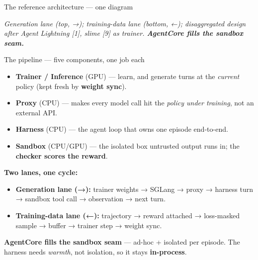 \documentclass[
  10pt,
  ignorenonframetext,
  aspectratio=169,
  t]{beamer}
\providecommand{\tightlist}{%
  \setlength{\itemsep}{0pt}\setlength{\parskip}{0pt}}
\begin{document}
\begin{frame}[allowframebreaks]{The reference architecture --- one diagram}
\begin{center}
{%
}
\end{center}

\emph{Generation lane (top, →); training-data lane (bottom, ←);
disaggregated design after Agent Lightning {[}1{]}, slime {[}9{]} as
trainer. \textbf{AgentCore fills the sandbox seam.}}
\end{frame}

\begin{frame}[allowframebreaks]{The pipeline --- five components, one job each}
\protect\hypertarget{the-pipeline-five-components-one-job-each}{}
\begin{itemize}
\tightlist
\item
  \textbf{Trainer / Inference} (GPU) --- learn, and generate turns at
  the \emph{current} policy (kept fresh by \textbf{weight sync}).
\item
  \textbf{Proxy} (CPU) --- makes every model call hit the \emph{policy
  under training}, not an external API.
\item
  \textbf{Harness} (CPU) --- the agent loop that owns one episode
  end-to-end.
\item
  \textbf{Sandbox} (CPU/GPU) --- the isolated box untrusted output runs
  in; the \textbf{checker scores the reward}.
\end{itemize}

\textbf{Two lanes, one cycle:}

\begin{itemize}
\tightlist
\item
  \textbf{Generation lane (→):} trainer weights → SGLang → proxy →
  harness turn → sandbox tool call → observation → next turn.
\item
  \textbf{Training-data lane (←):} trajectory → reward attached →
  loss-masked sample → buffer → trainer step → weight sync.
\end{itemize}

\textbf{AgentCore fills the sandbox seam} --- ad-hoc + isolated per
episode. The harness needs \emph{warmth}, not isolation, so it stays
\textbf{in-process}.
\end{frame}
\end{document}
